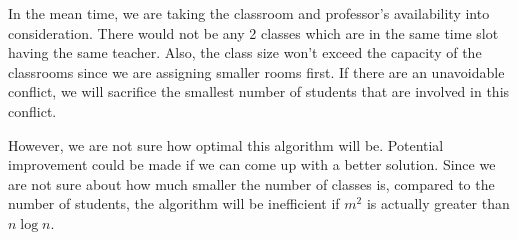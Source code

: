 \documentclass[11pt, oneside]{article}   	%
\begin{document}
In the mean time, we are taking the classroom and professor's availability into consideration. There would not be any 2 classes which are in the same time slot having the same teacher. Also, the class size won't exceed the capacity of the classrooms since we are assigning smaller rooms first. If there are an unavoidable conflict, we will sacrifice the smallest number of students that are involved in this conflict.

However, we are not sure how optimal this algorithm will be. Potential improvement could be made if we can come up with a better solution. Since we are not sure about how much smaller the number of classes is, compared to the number of students, the algorithm will be inefficient if $m^2$ is actually greater than $n \log n$.
\end{document}
